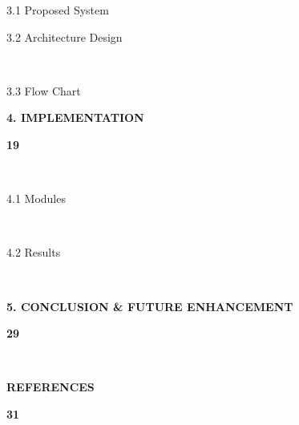 \documentclass[a4paper,12pt, English]{article}
\newcommand\tab[1][1cm]{\hspace*{#1}}
\begin{document}
\begin{titlepage}
 
{\begin{large}
{\tab\tab3.1 Proposed System}
\end{large}
} 
{
\begin{large}
\hspace{9.0cm}
\end{large}
}

{\begin{large}
{\tab\tab 3.2 Architecture Design}
\end{large}
} 
{
\begin{large}
\hspace{8.35cm}
\end{large}
}\\
{\begin{large}
{\tab\tab 3.3 Flow Chart}
\end{large}
}
{
\begin{large}
\hspace{10.0cm}
\end{large}
}
 
\noindent 
{\begin{large}
\textbf{\tab 4. IMPLEMENTATION }
\end{large}
} 
{
\begin{large}
\hspace{8.5cm}\textbf{19}
\end{large}
}\\
{\begin{large}
{\tab\tab 4.1  Modules }
\end{large}
}
{
\begin{large}
\hspace{10.3cm}
\end{large}
}\\
{\begin{large}
{\tab\tab 4.2 Results}
\end{large}
}
{
\begin{large}
\hspace{10.7cm}
\end{large}
}
\\
\noindent 
{\begin{large}
\textbf{\tab 5. CONCLUSION \& FUTURE ENHANCEMENT}
\end{large}
} 
{
\begin{large}
\hspace{3.1cm}\textbf{29}
\end{large}
}\\
\noindent 
{\begin{large}
\textbf{\tab  REFERENCES}
\end{large}
} 
{
\begin{large}
\hspace{10.55cm}\textbf{31}
\end{large}
}
\end{titlepage}
\end{document}
